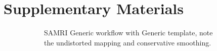 \renewcommand{\thetable}{S\arabic{table}}
\setcounter{figure}{0}
\renewcommand{\thefigure}{S\arabic{figure}}

\section{Supplementary Materials}

\begin{figure}[h!]
	\centering
	\begin{subfigure}[t]{0.48\textwidth}
		\centering
		\setlength{\fboxsep}{0pt}%
		\setlength{\fboxrule}{0.2pt}%
		\caption{
			SAMRI Generic workflow with Generic template, note the undistorted mapping and conservative smoothing.
			\vspace{1em}
			}
		\label{fig:fit_gg}
	\end{subfigure}\hfill
	\begin{subfigure}[t]{0.48\textwidth}
		\centering
		\setlength{\fboxsep}{0pt}%
		\setlength{\fboxrule}{0.2pt}%
		\fbox{
}
\end{subfigure}
\end{figure}
